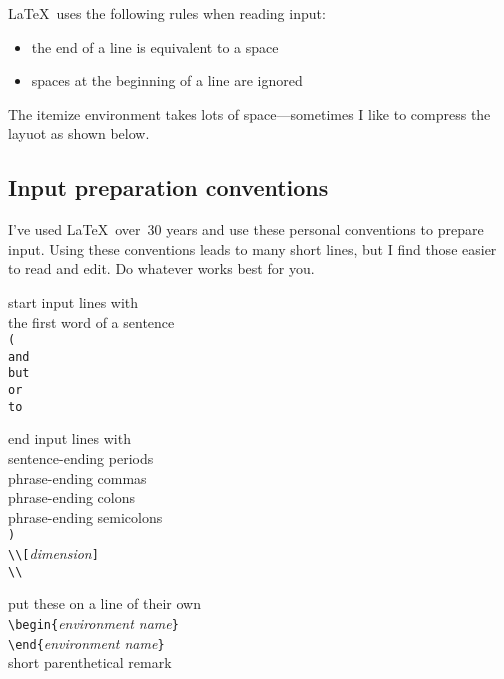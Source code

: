 \LaTeX\ uses the following rules when reading input:
\begin{itemize}
  \item the end of a line is equivalent to a space
  \item spaces at the beginning of a line are ignored
\end{itemize}

The itemize environment takes lots of space---sometimes
I like to compress the layuot as shown below.

\subsection{Input preparation conventions}

I've used \LaTeX\ over~30 years
and use these personal conventions
to prepare input.
Using these conventions leads
to many short lines,
but I find those easier
to read and edit.
Do whatever works best for you.

 start input lines with\\
   the first word of a sentence\\
   \verb+(+\\
   \verb+and+\\
   \verb+but+\\
   \verb+or+\\
   \verb+to+

\NL
{} end input lines with\\
   sentence-ending periods\\
   phrase-ending commas\\
   phrase-ending colons\\
   phrase-ending semicolons\\
   \verb+)+\\
   \verb+\\[+\textit{dimension}\verb+]+\\
   \verb+\\+

\NL
{} put these on a line of their own\\
   \verb+\begin{+\textit{environment name}\verb+}+\\
   \verb+\end{+\textit{environment name}\verb+}+\\
   short parenthetical remark


